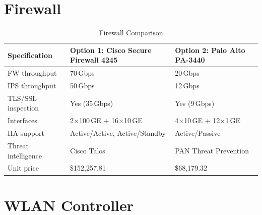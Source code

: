 \documentclass[12pt,a4paper]{report}
\begin{document}
\section{Firewall}

\begin{table}[H]
  \centering
  \caption{Firewall Comparison}
  \label{tab:fw_compare}
  \begin{tabular}{L{3.8cm} L{5.2cm} L{5.2cm}}
    \toprule
    \textbf{Specification} & \textbf{Option 1: Cisco Secure Firewall 4245} & \textbf{Option 2: Palo Alto PA-3440} \\
    \midrule
    FW throughput          & 70\,Gbps                             & 20\,Gbps \\
    IPS throughput         & 50\,Gbps                             & 12\,Gbps \\
    TLS/SSL inspection     & Yes (35\,Gbps)                       & Yes (9\,Gbps) \\
    Interfaces             & 2$\times$100\,GE + 16$\times$10\,GE & 4$\times$10\,GE + 12$\times$1\,GE \\
    HA support             & Active/Active, Active/Standby        & Active/Passive \\
    Threat intelligence    & Cisco Talos                          & PAN Threat Prevention \\
    Unit price       & \$152{,}257.81                       & \$68{,}179.32 \\
    \bottomrule
  \end{tabular}
\end{table}

\section{WLAN Controller}
\end{document}
